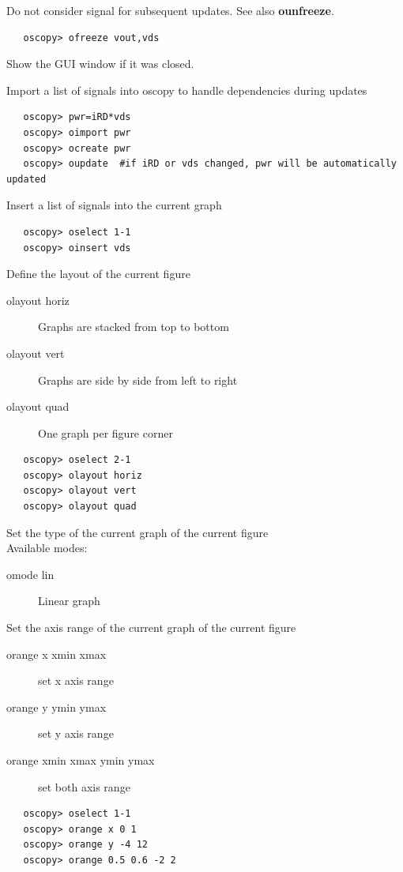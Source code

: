 \documentclass[a4paper,11pt]{article}
\begin{document}
   Do not consider signal for subsequent updates. See also \textbf{ounfreeze}.
\begin{verbatim}
   oscopy> ofreeze vout,vds
\end{verbatim}

   Show the GUI window if it was closed.

   Import a list of signals into oscopy to handle dependencies during updates
\begin{verbatim}
   oscopy> pwr=iRD*vds
   oscopy> oimport pwr
   oscopy> ocreate pwr
   oscopy> oupdate  #if iRD or vds changed, pwr will be automatically updated
\end{verbatim}

   Insert a list of signals into the current graph
\begin{verbatim}
   oscopy> oselect 1-1
   oscopy> oinsert vds
\end{verbatim}

   Define the layout of the current figure
   \begin{description}
   \item[olayout horiz] Graphs are stacked from top to bottom
   \item[olayout vert] Graphs are side by side from left to right
   \item[olayout quad] One graph per figure corner
   \end{description}
\begin{verbatim}
   oscopy> oselect 2-1
   oscopy> olayout horiz
   oscopy> olayout vert
   oscopy> olayout quad
\end{verbatim}

   Set the type of the current graph of the current figure\\
   Available modes:
   \begin{description}
   \item[omode lin]      Linear graph
   \end{description}

   Set the axis range of the current graph of the current figure
   \begin{description}
   \item[orange x xmin xmax] set x axis range
   \item[orange y ymin ymax] set y axis range
   \item[orange xmin xmax ymin ymax] set both axis range
   \end{description}
\begin{verbatim}
   oscopy> oselect 1-1
   oscopy> orange x 0 1
   oscopy> orange y -4 12
   oscopy> orange 0.5 0.6 -2 2
\end{verbatim}
\end{document}
